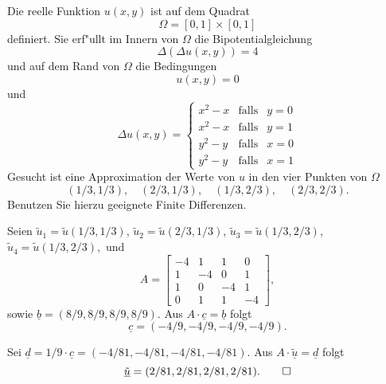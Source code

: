Die reelle Funktion $u(x,y)$ ist auf dem Quadrat
\[
\Omega = [0, 1] \times [0,1]
\]
definiert. Sie erf"ullt im Innern von $\Omega$ die Bipotentialgleichung
\[
\Delta ( \Delta u(x,y)) = 4
\]
und auf dem Rand von $\Omega$ die Bedingungen
\[
u(x,y) = 0
\]
und
\[
\Delta u(x,y)
=
\left\{
\begin{array}{ccl}
x^2 - x & \text{falls} & y = 0 \\
x^2 - x & \text{falls} & y = 1 \\
y^2 - y & \text{falls} & x = 0 \\
y^2 - y & \text{falls} & x = 1
\end{array} \right.
\]
Gesucht ist eine Approximation der Werte von $u$ in den vier Punkten von
$\Omega$
\[
(1/3,1/3), \quad  (2/3,1/3), \quad (1/3,2/3), \quad (2/3, 2/3).
\]
Benutzen Sie hierzu geeignete Finite Differenzen.

\begin{loesung}
Seien
$
\tilde u_1
=
\tilde u(1/3,1/3)
$,
$
\tilde u_2
=
\tilde u(2/3,1/3)
$,
$
\tilde u_3
=
\tilde u(1/3,2/3)$,
$
\tilde u_4
=
\tilde u(1/3,2/3),
$
und
\[
A = \left[\begin{array}{rrrr} 
-4  & 1  & 1 & 0 \\
 1 & -4 & 0 & 1 \\
 1 & 0 & -4 & 1 \\ 
 0 & 1 & 1  & -4  \end{array}\right],
\]
sowie
$\underline b = (8/9, 8/9, 8/9, 8/9)$.
Aus $A \cdot \underline{c} = \underline{b}$ folgt
\[
\underline{c} = (-4/9, -4/9, -4/9, - 4/9).
\]

Sei $\underline d = 1/9 \cdot \underline c = (-4/81, -4/81, -4/81, - 4/81)$.
Aus $A \cdot \underline{\tilde u} = \underline{d}$ folgt
\[
\underline{\tilde u} = (2/81, 2/81, 2/81, 2/81).
\qedhere
\]
\end{loesung}

